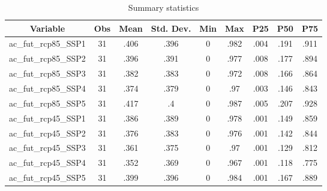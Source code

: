 \begin{table}[htbp]\centering \caption{Summary statistics\label{sumstat}}
\begin{tabular}{l c c c c c c c c}\hline\hline
\multicolumn{1}{c}{Variable} & Obs & Mean & Std. Dev.
 & Min & Max & P25 & P50 & P75  \\ \hline
ac\_fut\_rcp85\_SSP1 & 31 & .406 & .396 & 0 & .982 & .004 & .191 & .911 \\
ac\_fut\_rcp85\_SSP2 & 31 & .396 & .391 & 0 & .977 & .008 & .177 & .894 \\
ac\_fut\_rcp85\_SSP3 & 31 & .382 & .383 & 0 & .972 & .008 & .166 & .864 \\
ac\_fut\_rcp85\_SSP4 & 31 & .374 & .379 & 0 & .97 & .003 & .146 & .843 \\
ac\_fut\_rcp85\_SSP5 & 31 & .417 & .4 & 0 & .987 & .005 & .207 & .928 \\
ac\_fut\_rcp45\_SSP1 & 31 & .386 & .389 & 0 & .978 & .001 & .149 & .859 \\
ac\_fut\_rcp45\_SSP2 & 31 & .376 & .383 & 0 & .976 & .001 & .142 & .844 \\
ac\_fut\_rcp45\_SSP3 & 31 & .361 & .375 & 0 & .97 & .001 & .129 & .812 \\
ac\_fut\_rcp45\_SSP4 & 31 & .352 & .369 & 0 & .967 & .001 & .118 & .775 \\
ac\_fut\_rcp45\_SSP5 & 31 & .399 & .396 & 0 & .984 & .001 & .167 & .889 \\
\hline\end{tabular}
\end{table}
